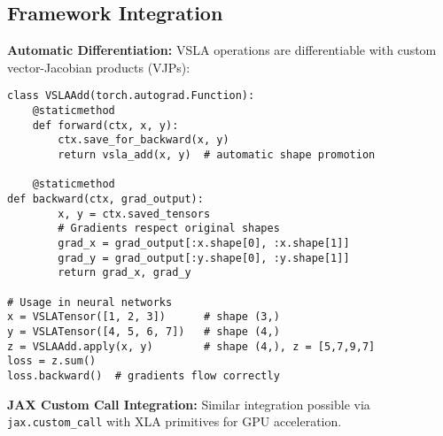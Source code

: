 \subsection{Framework Integration}
\textbf{Automatic Differentiation:} VSLA operations are differentiable with custom vector-Jacobian products (VJPs):

\begin{tcolorbox}[colback=api,colframe=green!50!black,title=PyTorch Integration Example]
\begin{verbatim}
class VSLAAdd(torch.autograd.Function):
    @staticmethod
    def forward(ctx, x, y):
        ctx.save_for_backward(x, y)
        return vsla_add(x, y)  # automatic shape promotion
    
    @staticmethod  
def backward(ctx, grad_output):
        x, y = ctx.saved_tensors
        # Gradients respect original shapes
        grad_x = grad_output[:x.shape[0], :x.shape[1]]  
        grad_y = grad_output[:y.shape[0], :y.shape[1]]
        return grad_x, grad_y

# Usage in neural networks
x = VSLATensor([1, 2, 3])      # shape (3,)
y = VSLATensor([4, 5, 6, 7])   # shape (4,) 
z = VSLAAdd.apply(x, y)        # shape (4,), z = [5,7,9,7]
loss = z.sum()
loss.backward()  # gradients flow correctly
\end{verbatim}
\end{tcolorbox}

\textbf{JAX Custom Call Integration:} Similar integration possible via \texttt{jax.custom\_call} with XLA primitives for GPU acceleration.
